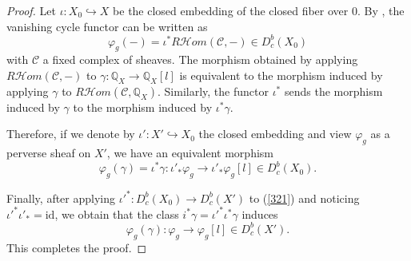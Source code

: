 \documentclass[11pt]{amsart}
\theoremstyle{plain}
\theoremstyle{definition}
\theoremstyle{remark}
\newcommand{\BQ}{{\mathbb{Q}}}
\newcommand{\CC}{{\mathcal C}}
\newcommand{\CF}{{\mathcal F}}
\newcommand{\CH}{{\mathcal H}}
\newcommand{\CK}{{\mathcal K}}
\begin{document}
\begin{proof}
Let $\iota: X_0 \hookrightarrow X$ be the closed embedding of the closed fiber over $0$. By \cite[Definition 8.6.2]{KS}, the vanishing cycle functor can be written as
\begin{equation}\label{vanishing}
\varphi_g(-) = \iota^* R\CH{om}(\CC, -) \in D^b_c(X_0)
\end{equation}
with $\CC$ a fixed complex of sheaves. The morphism obtained
by applying $R\CH{om}(\CC, -)$ to $\gamma: \BQ_X \to \BQ_X[l]$ 
is equivalent to the morphism induced by applying $\gamma$ to $R\CH{om}(\CC, \BQ_X)$.
Similarly, the functor $\iota^*$ sends the morphism induced by $\gamma$
to the morphism induced by $\iota^*\gamma$.

Therefore, if we denote by $\iota': X' \hookrightarrow X_0$ the closed embedding and view $\varphi_g$ as a perverse sheaf on $X'$, we have an equivalent morphism
\begin{equation}\label{321} 
\varphi_g(\gamma) = \iota^*\gamma:  \iota'_*\varphi_g \to \iota'_*\varphi_g[l] \in D^b_c(X_0). 
\end{equation}


Finally, after applying $\iota'^*: D^b_c(X_0) \rightarrow D^b_c(X')$ to (\ref{321}) and noticing $\iota'^*\iota'_*= \mathrm{id}$, we obtain that the class $i^*\gamma = \iota'^*\iota^*\gamma$ induces
\[
\varphi_g(\gamma): \varphi_g \to \varphi_g[l] \in D_c^b(X').
\]
This completes the proof.
\end{proof}
\end{document}
